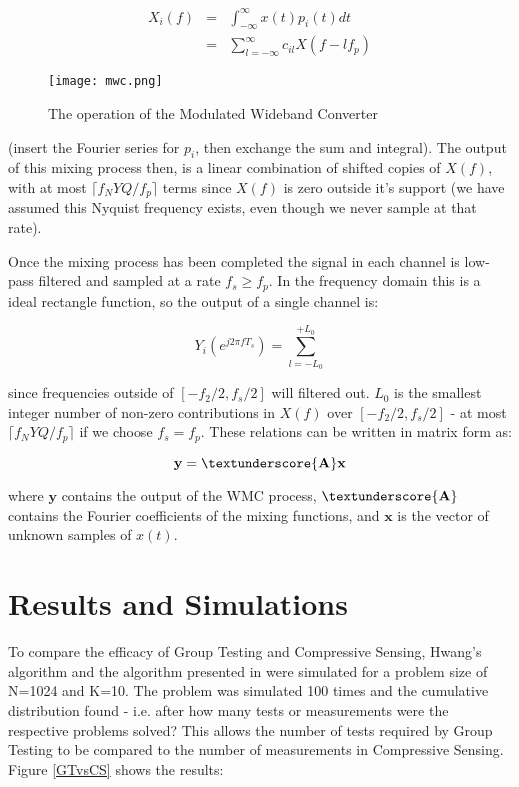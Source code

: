 \begin{align}
X_{i}\left(f\right) &=& \int_{-\infty}^{\infty} x\left(t\right) p_i\left(t\right) dt
\\ &=& \sum_{l=-\infty}^{\infty} c_{il} X\left(f-lf_p\right)
\end{align}

\begin{figure*}[h]
\centering
\texttt{[image: mwc.png]}
\caption{The operation of the Modulated Wideband Converter \cite{Mischali2010}}
\label{bayesiancs}
\end{figure*}

(insert the Fourier series for \(p_i\), then exchange the sum and integral). The output of this mixing process then, is a linear combination of shifted copies of \(X\left(f\right)\), with at most \(\lceil f_NYQ/f_p\rceil\) terms since \(X\left(f\right)\) is zero outside it's support (we have assumed this Nyquist frequency exists, even though we never sample at that rate).

Once the mixing process has been completed the signal in each channel is low-pass filtered and sampled at a rate \(f_s \geq f_p\). In the frequency domain this is a ideal rectangle function, so the output of a single channel is:

\begin{equation}
Y_i\left(e^{j 2 \pi f T_s }\right) = \sum_{l = -L_0}^{+L_0}
\end{equation}

since frequencies outside of \([-f_2/2, f_s/2]\) will filtered out. \(L_0\) is the smallest integer number of non-zero contributions in \(X\left(f\right)\) over \([-f_2/2, f_s/2]\) - at most \(\lceil f_NYQ/f_p\rceil\) if we choose \(f_s = f_p\). These relations can be written in matrix form as:

\begin{equation}
\textbf{y} = \textunderscore{\textbf{A}}\textbf{x}
\end{equation}

where \(\textbf{y}\) contains the output of the WMC process, \(\textunderscore{\textbf{A}}\) contains the Fourier coefficients of the mixing functions, and \(\textbf{x}\) is the vector of unknown samples of \(x\left(t\right)\). 


\section{Results and Simulations}
To compare the efficacy of Group Testing and Compressive Sensing, Hwang's algorithm and the algorithm presented in \cite{Aldrouobi} were simulated for a problem size of N=1024 and K=10.  The problem was simulated 100 times and the cumulative distribution found - i.e. after how many tests or measurements were the respective problems solved? This allows the number of tests required by Group Testing to be compared to the number of measurements in Compressive Sensing. Figure \ref{GTvsCS} shows the results:

